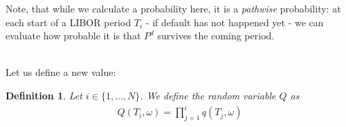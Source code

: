 \documentclass[12pt]{article}
\newtheorem{definition}[theorem]{Definition}
\begin{document}
	Note, that while we calculate a probability here, it is a \emph{pathwise} probability: at each start of a LIBOR period $T_i$ - if default has not happened yet - we can evaluate how probable it is that $P^d$ survives the coming period.

	\\Let us define a new value:
	\begin{definition}
		Let $i \in \{1, ..., N\}$. We define the random variable $Q$ as
		\begin{align*}
			Q(T_i, \omega) = \prod_{j=1}^{i}q(T_j, \omega)
		\end{align*}
	\end{definition}
\end{document}
